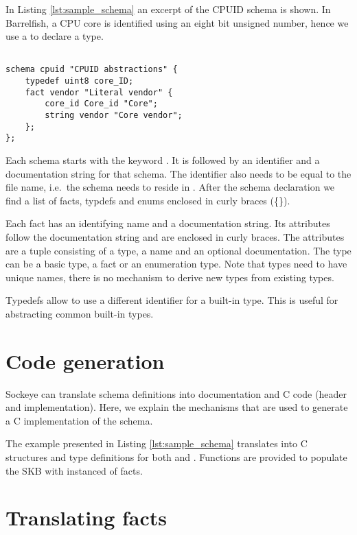 \documentclass[a4paper,11pt,twoside]{report}
\begin{document}
{{In Listing \ref{lst:sample_schema} an excerpt of the CPUID schema is shown. In
Barrelfish, a CPU core is identified using an eight bit unsigned number, hence
we use a  to declare a  type.

\begin{lstlisting}[caption={Sample Sockeye schema definition},
label={lst:sample_schema},language=sockeye]

schema cpuid "CPUID abstractions" {
    typedef uint8 core_ID;
    fact vendor "Literal vendor" {
        core_id Core_id "Core";
        string vendor "Core vendor";
    };
};
\end{lstlisting}

Each schema starts with the keyword . It is followed by an
identifier and a documentation string for that schema. The identifier also needs
to be equal to the file name, i.e.~the schema  needs to reside in
. After the schema declaration we find a list of facts,
typdefs and enums enclosed in curly braces (\{\}).

Each fact has an identifying name and a documentation string. Its attributes
follow the documentation string and are enclosed in curly braces. The attributes
are a tuple consisting of a type, a name and an optional documentation. The type
can be a basic type, a fact or an enumeration type. Note that types need to have
unique names, there is no mechanism to derive new types from existing types.

Typedefs allow to use a different identifier for a built-in type. This is useful
for abstracting common built-in types.


\section{Code generation}

Sockeye can translate schema definitions into documentation and C code (header
and implementation). Here, we explain the mechanisms that are used to generate a
C implementation of the schema.

The example presented in Listing \ref{lst:sample_schema} translates into C
structures and type definitions for both  and
. Functions are provided to populate the SKB with instanced of
facts.

\section{Translating facts}

}}
\end{document}
